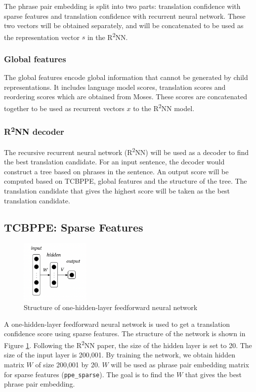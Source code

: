 \documentclass[12pt,a4paper,twoside,openright]{report}
\begin{document}
The phrase pair embedding is split into two parts: translation confidence with sparse features and translation confidence with recurrent neural network. These two vectors will be obtained separately, and will be concatenated to be used as the representation vector $s$ in the R\textsuperscript{2}NN.

\subsubsection{Global features}
The global features encode global information that cannot be generated by child representations. It includes language model scores, translation scores and reordering scores which are obtained from Moses. These scores are concatenated together to be used as recurrent vectors $x$ to the R\textsuperscript{2}NN model.

\subsubsection{R\textsuperscript{2}NN decoder}
The recursive recurrent neural network (R\textsuperscript{2}NN) will be used as a decoder to find the best translation candidate. For an input sentence, the decoder would construct a tree based on phrases in the sentence. An output score will be computed based on TCBPPE, global features and the structure of the tree. The translation candidate that gives the highest score will be taken as the best translation candidate.

\subsection{TCBPPE: Sparse Features}

\begin{figure}[ht]
\centering
\includegraphics[width=0.3\textwidth]{images/one_hidden_layer.png}
\caption{Structure of one-hidden-layer feedforward neural network}
\label{fig:one_hidden_layer}
\end{figure}

A one-hidden-layer feedforward neural network is used to get a translation confidence score using sparse features. The structure of the network is shown in Figure \ref{fig:one_hidden_layer}. Following the R\textsuperscript{2}NN paper\cite{r2nn}, the size of the hidden layer is set to 20. The size of the input layer is 200,001. By training the network, we obtain hidden matrix $W$ of size 200,001 by 20. $W$ will be used as phrase pair embedding matrix for sparse features (\texttt{ppe\_sparse}). The goal is to find the $W$ that gives the best phrase pair embedding.
\end{document}
